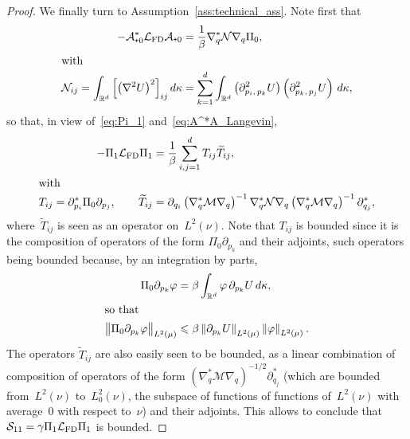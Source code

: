 \documentclass[10pt]{amsart}
\theoremstyle{definition}\newtheorem{defi}[theo]{Definition}\newtheorem{rema}[theo]{Remark}\newtheorem{exam}[theo]{Example}\newtheorem{exem}[theo]{Example}\newtheorem{nota}[theo]{Notation}
\newcommand{\cLs}{\mathcal{S}}
\newcommand{\cLa}{\mathcal{A}}
\newcommand{\cLM}{\mathcal{M}}
\newcommand{\cLN}{\mathcal{N}}
\newcommand{\R}{\mathbb{R}}
\newcommand{\cLFD}{\mathcal{L}_{\rm FD}}
\newcommand{\subplus}{\textnormal{\texttt{+}}}
\renewcommand{\leq}{\leqslant}
\begin{document}
\begin{proof}
We finally turn to Assumption~\ref{ass:technical_ass}. Note first that
\begin{align*}
-\cLa_{\subplus 0}^* \cLFD \cLa_{\subplus 0} &= \frac{1}{\beta} \nabla_q^* \cLN \nabla_q \Pi_0,
\\
\intertext{with}
\cLN_{ij} = \int_{\R^d} \left[\left(\nabla^2 U\right)^2\right]_{ij} d\kappa &= \sum_{k=1}^d \int_{\R^d} \left(\partial^2_{p_i,\,p_k} U\right)\left(\partial^2_{p_k,\,p_j} U\right) \, d\kappa,
\end{align*}
so that, in view of~\eqref{eq:Pi_1} and~\eqref{eq:A^*A_Langevin},
\begin{align*}
-\Pi_1 \cLFD \Pi_1 &= \frac{1}{\beta}\sum_{i,j=1}^d T_{ij}\widetilde{T}_{ij},
\\
\intertext{with}
T_{ij} = \partial_{p_i}^* \Pi_0 \partial_{p_j},
\qquad
\widetilde{T}_{ij} &= \partial_{q_i} \left(\nabla_q^* \cLM \nabla_q\right)^{-1}\nabla_q^* \cLN \nabla_q \left(\nabla_q^* \cLM \nabla_q\right)^{-1} \partial_{q_j}^*,
\end{align*}
where~$\widetilde{T}_{ij}$ is seen as an operator on~$L^2(\nu)$. Note that $T_{ij}$ is bounded since it is the composition of operators of the form $\Pi_0 \partial_{p_k}$ and their adjoints, such operators being bounded because, by an integration by parts,
\begin{align*}
\Pi_0 \partial_{p_k} \varphi &= \beta \int_{\R^d} \varphi \, \partial_{p_k}U \, d\kappa,
\\
\intertext{so that}
\big\| \Pi_0 \partial_{p_k} \varphi \big\|_{L^2(\mu)} &\leq \beta\left\|\partial_{p_k} U\right\|_{L^2(\mu)}\left\|\varphi\right\|_{L^2(\mu)}.
\end{align*}
The operators $\widetilde{T}_{ij}$ are also easily seen to be bounded, as a linear combination of composition of operators of the form $(\nabla_q^* \cLM \nabla_q)^{-1/2} \partial_{q_j}^*$ (which are bounded from~$L^2(\nu)$ to~$L^2_0(\nu)$, the subspace of functions of functions of~$L^2(\nu)$ with average~0 with respect to~$\nu$) and their adjoints. This allows to conclude that $\cLs_{11} = \gamma \Pi_1\cLFD \Pi_1$ is bounded.


\end{proof}
\end{document}
